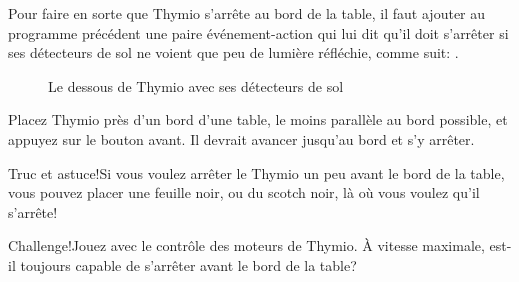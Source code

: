 Pour faire en sorte que Thymio s'arrête au bord de la table, il faut ajouter au programme précédent une paire événement-action qui lui dit qu'il doit s'arrêter si ses détecteurs de sol ne voient que peu de lumière réfléchie, comme suit: .

\begin{figure}
\begin{center}
\caption{Le dessous de Thymio avec ses détecteurs de sol}\label{fig.bottom}
\end{center}
\end{figure}

Placez Thymio près d'un bord d'une table, le moins parallèle au bord possible, et appuyez sur le bouton avant. Il devrait avancer jusqu'au bord et s'y arrêter. 

\begin{bclogo}[couleur = blue!30, arrondi = 0.1, logo = \bcinfo, ombre = true]{Truc et astuce!}Si vous voulez arrêter le Thymio un peu avant le bord de la table, vous pouvez placer une feuille noir, ou du scotch noir, là où vous voulez qu'il s'arrête! 
\end{bclogo}

\begin{bclogo}[couleur = pink!30, arrondi = 0.1, logo = \bccrayon, ombre = true]{Challenge!}Jouez avec le contrôle des moteurs de Thymio. À vitesse maximale, est-il toujours capable de s'arrêter avant le bord de la table?
\end{bclogo}